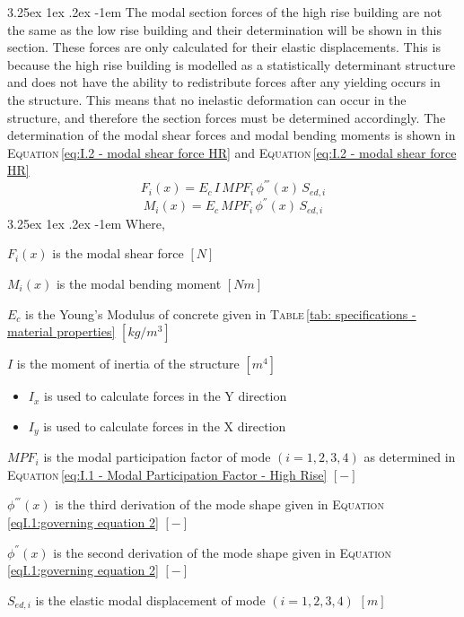 \documentclass[11pt,a4paper,titlepage]{report}
\makeatletter
\renewcommand\paragraph{\@startsection{paragraph}{5}{\z@}%
  {3.25ex \@plus1ex \@minus.2ex}%
  {-1em}%
  {\normalfont\normalsize\bfseries}}
\makeatother
\begin{document}
\paragraph{}The modal section forces of the high rise building are not the same as the low rise building and their determination will be shown in this section. These forces are only calculated for their elastic displacements. This is because the high rise building is modelled as a statistically determinant structure and does not have the ability to redistribute forces after any  yielding occurs in the structure. This means that no inelastic deformation can occur in the structure, and therefore the section forces must be determined accordingly. The determination of the modal shear forces and modal bending moments is shown in \textsc{Equation}\,\eqref{eq:I.2 - modal shear force HR} and \textsc{Equation}\,\eqref{eq:I.2 - modal shear force HR}
\begin{equation}
    F_i(x)=E_c\,I\,MPF_i\,\phi^{'''}(x)\,S_{ed,i}
    \label{eq:I.2 - modal shear force HR}
\end{equation}
\begin{equation}
    M_i(x)=E_c\,MPF_i\,\phi^{''}(x)\,S_{ed,i}
\end{equation}
\paragraph{}Where,
\begin{itemize}
\begin{small}
    \item $F_i(x)$ is the modal shear force $[N]$ 
    \item $M_i(x)$ is the modal bending moment $[Nm]$
    \item $E_c$ is the Young's Modulus of concrete given in \textsc{Table}\,\ref{tab: specifications - material properties} $[kg/m^3]$
    \item $I$ is the moment of inertia of the structure $[m^4]$
    \begin{itemize}
        \item $I_x$ is used to calculate forces in the Y direction
        \item $I_y$ is used to calculate forces in the X direction
    \end{itemize}
    \item $MPF_i$ is the modal participation factor of mode $(i=1,2,3,4)$ as determined in \textsc{Equation}\,\eqref{eq:I.1 - Modal Participation Factor - High Rise} $[-]$
    \item $\phi^{'''}(x)$ is the third derivation of the mode shape given in \textsc{Equation}\,\eqref{eqI.1:governing equation 2} $[-]$
    \item $\phi^{''}(x)$ is the second derivation of the mode shape given in \textsc{Equation}\,\eqref{eqI.1:governing equation 2} $[-]$
    \item $S_{ed,i}$ is the elastic modal displacement of mode $(i=1,2,3,4)$ $[m]$
\end{small}
\end{itemize}
\end{document}
